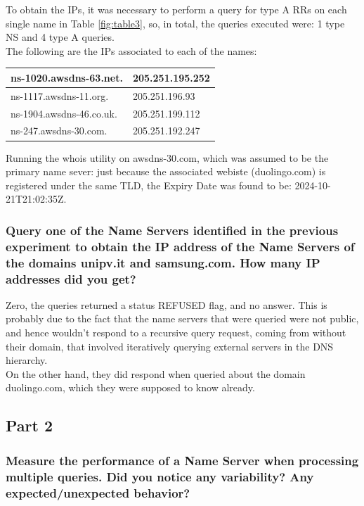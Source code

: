 \documentclass[a4paper,10pt]{article}
\begin{document}
To obtain the IPs, it was necessary to perform a query for type A RRs on each single name in Table \ref{fig:table3}, so, in total, the queries executed were: 1 type NS and 4 type A queries.\\ The following are the IPs associated to each of the names:

\begin{table}[h!]
\centering
\begin{tabular}{|l|l|}
\hline
ns-1020.awsdns-63.net.   & 205.251.195.252 \\ \hline
ns-1117.awsdns-11.org.   & 205.251.196.93  \\ \hline
ns-1904.awsdns-46.co.uk. & 205.251.199.112 \\ \hline
ns-247.awsdns-30.com.    & 205.251.192.247 \\ \hline
\end{tabular}
\end{table}

Running the whois utility on awsdns-30.com, which was assumed to be the primary name sever: just because the associated webiste (duolingo.com) is registered under the same TLD, the Expiry Date was found to be: 2024-10-21T21:02:35Z.


\subsubsection{Query one of the Name Servers identified in the previous experiment to obtain the IP address of the Name Servers of the domains unipv.it and samsung.com.
How many IP addresses did you get?}

Zero, the queries returned a status REFUSED flag, and no answer. This is probably due to the fact that the name servers that were queried were not public, and hence wouldn't respond to a recursive query request, coming from without their domain, that involved iteratively querying external servers in the DNS hierarchy.\\

On the other hand, they did respond when queried about the domain duolingo.com, which they were supposed to know already.


\subsection{Part 2}


\subsubsection{Measure the performance of a Name Server when processing multiple queries. 
Did you notice any variability? Any expected/unexpected behavior?}
\end{document}

